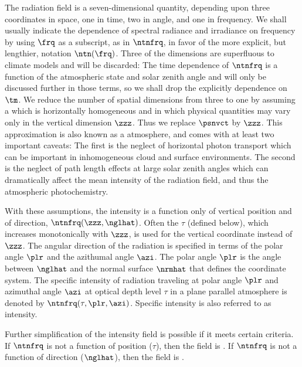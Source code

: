 \documentclass[12pt]{article}
\begin{document}
The radiation field is a seven-dimensional quantity, depending upon
three coordinates in space, one in time, two in angle, and one in
frequency.   
We shall usually indicate the dependence of spectral radiance and 
irradiance on frequency by using $\frq$ as a subscript, as in
$\ntnfrq$, in favor of the more explicit, but lengthier, notation
$\ntn(\frq)$. 
Three of the dimensions are superfluous to climate models and will
be discarded:
The time dependence of $\ntnfrq$ is a function of the atmospheric
state and solar zenith angle and will only be discussed further in
those terms, so we shall drop the explicitly dependence on $\tm$.
We reduce the number of spatial dimensions from three to one by
assuming a  which is horizontally
homogeneous and in which physical quantities may vary only in the
vertical dimension $\zzz$.
Thus we replace $\psnvct$ by $\zzz$.
This approximation is also known as a 
atmosphere, and comes with at least two important caveats:
The first is the neglect of horizontal photon transport which can be
important in inhomogeneous cloud and surface environments.
The second is the neglect of path length effects at large solar zenith
angles which can dramatically affect the mean intensity of the
radiation field, and thus the atmospheric photochemistry.

With these assumptions, the intensity is a function only of vertical
position and of direction, $\ntnfrq(\zzz,\nglhat)$.
Often the  $\tau$ (defined below), which
increases monotonically with $\zzz$, is used for the vertical
coordinate instead of $\zzz$. 
The angular direction of the radiation is specified in terms of the
polar angle $\plr$ and the azithumal angle $\azi$.
The polar angle $\plr$ is the angle between $\nglhat$ and the normal  
surface $\nrmhat$ that defines the coordinate system.
The specific intensity of radiation traveling at polar angle
$\plr$ and azimuthal angle $\azi$ at optical depth level $\tau$ in a
plane parallel atmosphere is denoted by $\ntnfrq(\tau,\plr,\azi)$.
Specific intensity is also referred to as intensity.

Further simplification of the intensity field is possible if it
meets certain criteria.
If $\ntnfrq$ is not a function of position ($\tau$), then the field is
. 
If $\ntnfrq$ is not a function of direction ($\nglhat$), then the
field is . 
\end{document}
